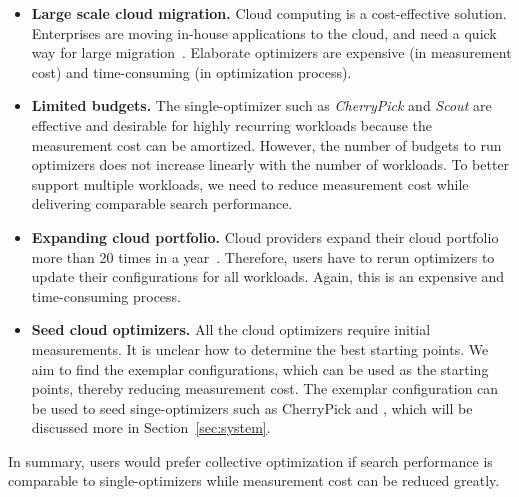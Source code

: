 \begin{itemize}
\item \textbf{Large scale cloud migration.}
Cloud computing is a cost-effective solution.
Enterprises are moving in-house applications to the cloud,
and need a quick way for large migration~\cite{khajeh2010cloud,sripanidkulchai2010clouds}.
Elaborate optimizers are expensive (in measurement cost) and time-consuming (in optimization process).

\item \textbf{Limited budgets.}
The single-optimizer such as \emph{CherryPick} and \emph{Scout} are effective and desirable for highly recurring workloads because the measurement cost can be amortized.
However, the number of budgets to run optimizers
does not increase linearly with the number of workloads.
To better support multiple workloads,
we need to reduce measurement cost while delivering comparable search performance.

\item \textbf{Expanding cloud portfolio.}
Cloud providers expand their cloud portfolio more than 20 times in a year~\cite{ec2history}.
Therefore, users have to rerun optimizers to update their configurations for all workloads.
Again, this is an expensive and time-consuming process.

\item \textbf{Seed cloud optimizers.}
All the cloud optimizers require initial measurements.
It is unclear how to determine the best starting points.
We aim to find the exemplar configurations,
which can be used as the starting points, thereby
reducing measurement cost.
The exemplar configuration can be used to seed singe-optimizers such as CherryPick and \scout, which will be discussed more in Section~\ref{sec:system}.

\end{itemize}

In summary, users would prefer collective optimization if search performance is comparable to single-optimizers while measurement cost can be reduced greatly.
